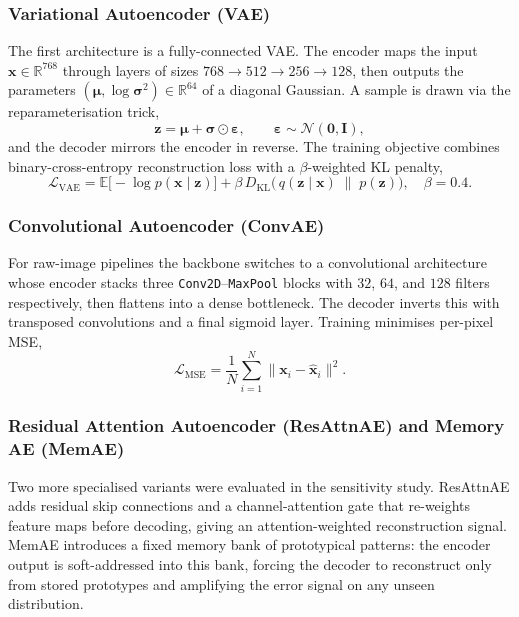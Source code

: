 \subsubsection{Variational Autoencoder (VAE)}
The first architecture is a fully-connected VAE. The encoder maps the input
$\mathbf{x}\in\mathbb{R}^{768}$ through layers of sizes
$768\!\to\!512\!\to\!256\!\to\!128$, then outputs the parameters
$(\boldsymbol{\mu},\log\boldsymbol{\sigma}^2)\in\mathbb{R}^{64}$ of a diagonal
Gaussian. A sample is drawn via the reparameterisation trick,
\begin{equation}
    \mathbf{z} = \boldsymbol{\mu} + \boldsymbol{\sigma}\odot\boldsymbol{\varepsilon},
    \qquad \boldsymbol{\varepsilon}\sim\mathcal{N}(\mathbf{0},\mathbf{I}),
    \label{eq:reparam}
\end{equation}
and the decoder mirrors the encoder in reverse. The training objective combines
binary-cross-entropy reconstruction loss with a $\beta$-weighted KL penalty,
\begin{equation}
    \mathcal{L}_\text{VAE} = \mathbb{E}\bigl[-\log p(\mathbf{x}\mid\mathbf{z})\bigr]
      + \beta\,D_\text{KL}\!\bigl(\,q(\mathbf{z}\mid\mathbf{x})\;\|\;
                                    p(\mathbf{z})\bigr),\quad \beta=0.4.
    \label{eq:vae_loss}
\end{equation}

\subsubsection{Convolutional Autoencoder (ConvAE)}
For raw-image pipelines the backbone switches to a convolutional architecture whose
encoder stacks three \texttt{Conv2D}--\texttt{MaxPool} blocks with $32$, $64$, and
$128$ filters respectively, then flattens into a dense bottleneck. The decoder inverts
this with transposed convolutions and a final sigmoid layer. Training minimises
per-pixel MSE,
\begin{equation}
    \mathcal{L}_\text{MSE} = \frac{1}{N}\sum_{i=1}^{N}
                             \bigl\|\mathbf{x}_i - \hat{\mathbf{x}}_i\bigr\|^2.
    \label{eq:mse}
\end{equation}

\subsubsection{Residual Attention Autoencoder (ResAttnAE) and Memory AE (MemAE)}
Two more specialised variants were evaluated in the sensitivity study. ResAttnAE adds
residual skip connections and a channel-attention gate that re-weights feature maps
before decoding, giving an attention-weighted reconstruction signal. MemAE introduces a
fixed memory bank of prototypical patterns: the encoder output is soft-addressed into
this bank, forcing the decoder to reconstruct only from stored prototypes and amplifying
the error signal on any unseen distribution.

